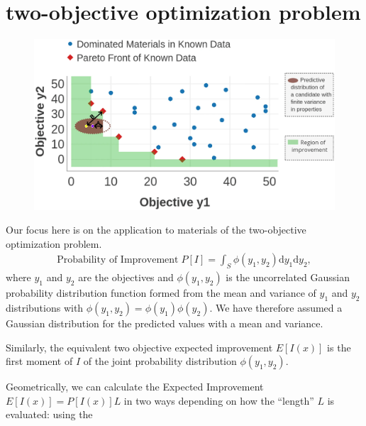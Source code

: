 \documentclass[12pt]{article}
\begin{document}
	\section{two-objective optimization problem}


	\begin{figure}[!h]
		\centering
		\includegraphics[width=0.7\linewidth]{PF.jpg}
		\caption{}
		\label{fig:pf}
	\end{figure}

	Our focus here is on the application to materials of the two-objective optimization problem.
	\begin{align*}
	\text{Probability of Improvement}\; P[I]=\int_S \phi(y_1, y_2) \mathrm{d}y_1\mathrm{d}y_2,
		\end{align*} where $y_1$ and $y_2$ are the objectives and $\phi(y_1, y_2)$ is the uncorrelated
	Gaussian probability distribution function formed from the mean and
	variance of $y_1$ and $y_2$ distributions with $\phi(y_1, y_2) = \phi(y_1) \phi(y_2)$.
	We have therefore assumed a Gaussian distribution for the predicted
	values with a mean and variance.

	Similarly, the equivalent two objective expected improvement $E[I(x)]$
	is the first moment of $I$ of the joint probability distribution $\phi(y_1, y_2)$.

	Geometrically, we can calculate the Expected Improvement $E[I(x)] = P[I(x)]L$ in
	two ways depending on how the ``length'' $L$ is evaluated: using the
\end{document}

